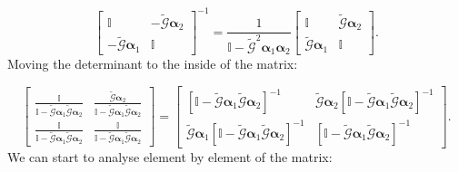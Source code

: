 \begin{equation}
\begin{bmatrix}\mathbb{I} & -\tilde{\mathcal{G}}\boldsymbol{\alpha}_{2}\\
-\tilde{\mathcal{G}}\boldsymbol{\alpha}_{1} & \mathbb{I}
\end{bmatrix}^{-1}=\frac{1}{\mathbb{I}-\tilde{\mathcal{G}}^{2}\boldsymbol{\alpha}_{1}\boldsymbol{\alpha}_{2}}\begin{bmatrix}\mathbb{I} & \tilde{\mathcal{G}}\boldsymbol{\alpha}_{2}\\
\tilde{\mathcal{G}}\boldsymbol{\alpha}_{1} & \mathbb{I}
\end{bmatrix}.
\end{equation}
Moving the determinant to the inside of the matrix:

\begin{equation}
\begin{bmatrix}\frac{\mathbb{I}}{\mathbb{I}-\tilde{\mathcal{G}}\boldsymbol{\alpha}_{1}\tilde{\mathcal{G}}\boldsymbol{\alpha}_{2}} & \frac{\tilde{\mathcal{G}}\boldsymbol{\alpha}_{2}}{\mathbb{I}-\tilde{\mathcal{G}}\boldsymbol{\alpha}_{1}\tilde{\mathcal{G}}\boldsymbol{\alpha}_{2}}\\
\frac{\mathbb{I}}{\mathbb{I}-\tilde{\mathcal{G}}\boldsymbol{\alpha}_{1}\tilde{\mathcal{G}}\boldsymbol{\alpha}_{2}} & \frac{\mathbb{I}}{\mathbb{I}-\tilde{\mathcal{G}}\boldsymbol{\alpha}_{1}\tilde{\mathcal{G}}\boldsymbol{\alpha}_{2}}
\end{bmatrix}=\begin{bmatrix}\left[\mathbb{I}-\tilde{\mathcal{G}}\boldsymbol{\alpha}_{1}\tilde{\mathcal{G}}\boldsymbol{\alpha}_{2}\right]^{-1} & \tilde{\mathcal{G}}\boldsymbol{\alpha}_{2}\left[\mathbb{I}-\tilde{\mathcal{G}}\boldsymbol{\alpha}_{1}\tilde{\mathcal{G}}\boldsymbol{\alpha}_{2}\right]^{-1}\\
\tilde{\mathcal{G}}\boldsymbol{\alpha}_{1}\left[\mathbb{I}-\tilde{\mathcal{G}}\boldsymbol{\alpha}_{1}\tilde{\mathcal{G}}\boldsymbol{\alpha}_{2}\right]^{-1} & \left[\mathbb{I}-\tilde{\mathcal{G}}\boldsymbol{\alpha}_{1}\tilde{\mathcal{G}}\boldsymbol{\alpha}_{2}\right]^{-1}
\end{bmatrix}.
\end{equation}
We can start to analyse element by element of the matrix:

